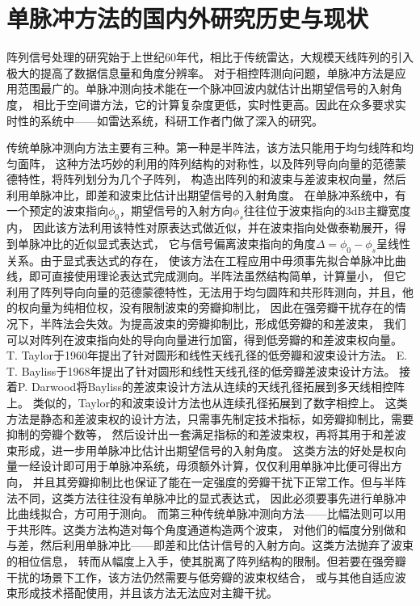 \documentclass[master]{thesis-uestc}
\begin{document}
\section{单脉冲方法的国内外研究历史与现状}
阵列信号处理的研究始于上世纪60年代，相比于传统雷达，大规模天线阵列的引入极大的提高了数据信息量和角度分辨率。
对于相控阵测向问题，单脉冲方法是应用范围最广的。单脉冲测向技术能在一个脉冲回波内就估计出期望信号的入射角度，
相比于空间谱方法，它的计算复杂度更低，实时性更高。因此在众多要求实时性的系统中——如雷达系统，科研工作者门做了深入的研究。

传统单脉冲测向方法主要有三种\cite{Sun}。第一种是半阵法\cite{Xun}，该方法只能用于均匀线阵和均匀面阵，
这种方法巧妙的利用的阵列结构的对称性，以及阵列导向向量的范德蒙德特性，将阵列划分为几个子阵列，
构造出阵列的和波束与差波束权向量，然后利用单脉冲比，即差和波束比估计出期望信号的入射角度。
在单脉冲系统中，有一个预定的波束指向$\phi_0$，期望信号的入射方向$\phi_s$往往位于波束指向的3dB主瓣宽度内，
因此该方法利用该特性对原表达式做近似，并在波束指向处做泰勒展开，得到单脉冲比的近似显式表达式，
它与信号偏离波束指向的角度$\Delta=\phi_0 - \phi_s$呈线性关系。由于显式表达式的存在，
使该方法在工程应用中毋须事先拟合单脉冲比曲线，即可直接使用理论表达式完成测向。半阵法虽然结构简单，计算量小，
但它利用了阵列导向向量的范德蒙德特性，无法用于均匀圆阵和共形阵测向，并且，他的权向量为纯相位权，没有限制波束的旁瓣抑制比，
因此在强旁瓣干扰存在的情况下，半阵法会失效。为提高波束的旁瓣抑制比，形成低旁瓣的和差波束，
我们可以对阵列在波束指向处的导向向量进行加窗，得到低旁瓣的和差波束权向量。
T. Taylor于1960年提出了针对圆形和线性天线孔径的低旁瓣和波束设计方法\cite{Taylor_55,Taylor}。
E. T. Bayliss于1968年提出了针对圆形和线性天线孔径的低旁瓣差波束设计方法\cite{Bayliss}。
接着P. Darwood将Bayliss的差波束设计方法从连续的天线孔径拓展到多天线相控阵上\cite{Darwood}。
类似的，Taylor的和波束设计方法也从连续孔径拓展到了数字相控上\cite{Folgueiras}。
这类方法是静态和差波束权的设计方法，只需事先制定技术指标，如旁瓣抑制比，需要抑制的旁瓣个数等，
然后设计出一套满足指标的和差波束权，再将其用于和差波束形成，进一步用单脉冲比估计出期望信号的入射角度。
这类方法的好处是权向量一经设计即可用于单脉冲系统，毋须额外计算，仅仅利用单脉冲比便可得出方向，
并且其旁瓣抑制比也保证了能在一定强度的旁瓣干扰下正常工作。但与半阵法不同，这类方法往往没有单脉冲比的显式表达式，
因此必须要事先进行单脉冲比曲线拟合，方可用于测向。
而第三种传统单脉冲测向方法——比幅法则可以用于共形阵\cite{Mosca}。这类方法构造对每个角度通道构造两个波束，
对他们的幅度分别做和与差，然后利用单脉冲比——即差和比估计信号的入射方向。这类方法抛弃了波束的相位信息，
转而从幅度上入手，使其脱离了阵列结构的限制。但若要在强旁瓣干扰的场景下工作，该方法仍然需要与低旁瓣的波束权结合，
或与其他自适应波束形成技术搭配使用，并且该方法无法应对主瓣干扰。
\end{document}
